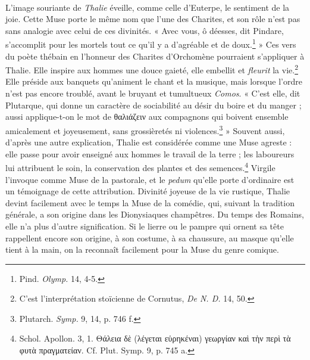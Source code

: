 \documentclass[landscape, a4paper, 11pt, oneside, polutonikogreek, french]{article}
\begin{document}
\paragraph{}
L'image souriante de \emph{Thalie} éveille, comme celle d'Euterpe, le sentiment de la joie. Cette Muse porte le même nom que l'une des Charites, et son rôle n'est pas sans analogie avec celui de ces divinités. « Avec vous, ô déesses, dit Pindare, s'accomplit pour les mortels tout ce qu'il y a d'agréable et de doux.\footnote{Pind. \emph{Olymp.} 14, 4-5.} » Ces vers du poète thébain en l'honneur des Charites d'Orchomène pourraient s'appliquer à Thalie. Elle inspire aux hommes une douce gaieté, elle embellit et \emph{fleurit} la vie.\footnote{C'est l'interprétation stoïcienne de Cornutus, \emph{De N. D.} 14, 50.} Elle préside aux banquets qu'animent le chant et la musique, mais lorsque l'ordre n'est pas encore troublé, avant le bruyant et tumultueux \emph{Comos}. « C'est elle, dit Plutarque, qui donne un caractère de sociabilité au désir du boire et du manger ; aussi applique-t-on le mot de θαλιάζειν aux compagnons qui boivent ensemble amicalement et joyeusement, sans grossièretés ni violences.\footnote{Plutarch. \emph{Symp.} 9, 14, p. 746 f.} » Souvent aussi, d'après une autre explication, Thalie est considérée comme une Muse agreste : elle passe pour avoir enseigné aux hommes le travail de la terre ; les laboureurs lui attribuent le soin, la conservation des plantes et des semences.\footnote{Schol. Apollon. 3, 1. Θάλεια δὲ (λέγεται εὑρηκέναι) γεωργίαν καὶ τὴν περὶ τὰ φυτὰ πραγματείαν. Cf. Plut. Symp. 9, p. 745 a.} Virgile l'invoque comme Muse de la pastorale, et le \emph{pedum} qu'elle porte d'ordinaire est un témoignage de cette attribution. Divinité joyeuse de la vie rustique, Thalie devint facilement avec le temps la Muse de la comédie, qui, suivant la tradition générale, a son origine dans les Dionysiaques champêtres. Du temps des Romains, elle n'a plus d'autre signification. Si le lierre ou le pampre qui ornent sa tête rappellent encore son origine, à son costume, à sa chaussure, au masque qu'elle tient à la main, on la reconnaît facilement pour la Muse du genre comique.
\end{document}
